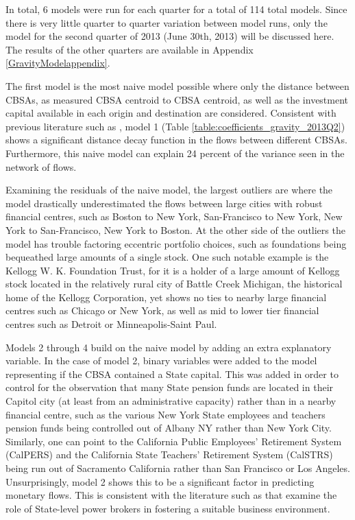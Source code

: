 In total, 6 models were run for each quarter for a total of 114 total models.  Since there is very little quarter to quarter variation between model runs, only the model for the second quarter of 2013 (June 30th, 2013) will be discussed here.  The results of the other quarters are available in Appendix \ref{GravityModelappendix}.  

The first model is the most naive model possible where only the distance between CBSAs, as measured CBSA centroid to CBSA centroid, as well as the investment capital available in each origin and destination are considered.  Consistent with previous literature such as \cite{Green1995,gravesthe1998,covalhome1999,covalthe2001,Dovak2005}, model 1 (Table \ref{table:coefficients_gravity_2013Q2}) shows a significant distance decay function in the flows between different CBSAs. Furthermore, this naive model can explain 24 percent of the variance seen in the network of flows.  

Examining the residuals of the naive model, the largest outliers are where the model drastically underestimated the flows between large cities with robust financial centres, such as Boston to New York, San-Francisco to New York, New York to San-Francisco, New York to Boston. At the other side of the outliers the model has trouble factoring eccentric portfolio choices, such as foundations being bequeathed large amounts of a single stock.  One such notable example is the Kellogg W. K. Foundation Trust, for it is a holder of a large amount of Kellogg stock located in the relatively rural city of Battle Creek Michigan, the historical home of the Kellogg Corporation, yet shows no ties to nearby large financial centres such as Chicago or New York, as well as mid to lower tier financial centres such as Detroit or Minneapolis-Saint Paul.  

Models 2 through 4 build on the naive model by adding an extra explanatory variable.  In the case of model 2, binary variables were added to the model representing if the CBSA contained a State capital.  This was added in order to control for the observation that many State pension funds are located in their Capitol city (at least from an administrative capacity) rather than in a nearby financial centre, such as the various New York State employees and teachers pension funds being controlled out of Albany NY rather than New York City.  Similarly, one can point to the California Public Employees' Retirement System  (CalPERS) and the California State Teachers' Retirement System (CalSTRS) being run out of Sacramento California rather than San Francisco or Los Angeles.  Unsurprisingly, model 2 shows this to be a significant factor in predicting monetary flows. This is consistent with the literature such as \cite{Bradley2016} that examine the role of State-level power brokers in fostering a suitable business environment.

